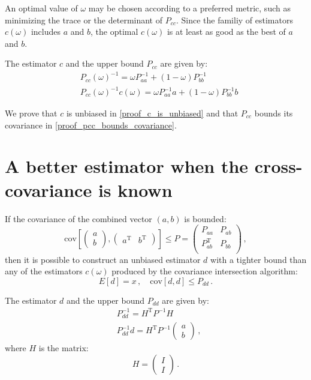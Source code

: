 \documentclass[11pt]{article}
\newcommand{\cov}{\mathrm{cov}}
\newcommand{\transpose}{\mathrm{\scriptscriptstyle T}}
\begin{document}
An optimal value of $\omega$ may be chosen according to a preferred metric,
such as minimizing the trace or the determinant of $P_{cc}$. Since the familiy
of estimators $c(\omega)$ includes $a$ and $b$, the optimal $c(\omega)$ is at
least as good as the best of $a$ and $b$.

The estimator $c$ and the upper bound $P_{cc}$ are given by:
\begin{align}
&P_{cc}(\omega)^{-1} =\omega P_{aa}^{-1} + (1 - \omega) P_{bb}^{-1}\\
&P_{cc}(\omega)^{-1}c(\omega) = \omega P_{aa}^{-1}a + (1 - \omega) P_{bb}^{-1}b
\end{align}

We prove that $c$ is unbiased in \ref{proof_c_is_unbiased} and that $P_{cc}$
bounds its covariance in \ref{proof_pcc_bounds_covariance}.

\section{A better estimator when the cross-covariance is known}

If the covariance of the combined vector $(a, b)$ is bounded:
\begin{equation}
    \cov \left[
    \begin{pmatrix}a\\b\end{pmatrix}, 
\begin{pmatrix}a^\transpose & b^{\transpose}\end{pmatrix}\right] \le P = 
\begin{pmatrix}
    P_{aa} & P_{a b}\\
    P_{ab}^\transpose & P_{b b}\\
\end{pmatrix}
\,,
\end{equation}
then it is possible to construct an unbiased estimator $d$ with a tighter bound
than any of the estimators $c(\omega)$ produced by the covariance intersection
algorithm:
\begin{equation}
    E[d] = x\,,\quad
    \cov \left[d, d\right] \le P_{dd}\,.
\end{equation}

The estimator $d$ and the upper bound $P_{dd}$ are given by:
\begin{align}
&P_{dd}^{-1} =H^\transpose P^{-1} H\\
&P_{dd}^{-1}d = H^\transpose P^{-1} \begin{pmatrix}a \\ b\end{pmatrix}\,,
\end{align}
where $H$ is the matrix:
\begin{equation}
H = \begin{pmatrix}I \\ I \end{pmatrix}\,.
\end{equation}
\end{document}

